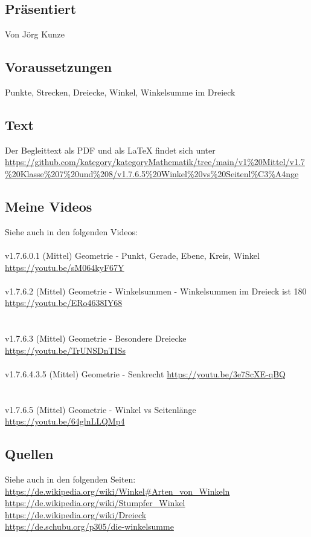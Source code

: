 \documentclass[a4paper]{amsart}
\theoremstyle{definition}
\begin{document}
\subsection*{Präsentiert}
Von Jörg Kunze

\subsection*{Voraussetzungen}
Punkte, Strecken, Dreiecke, Winkel, Winkelsumme im Dreieck

\subsection*{Text}
Der Begleittext als PDF und als LaTeX findet sich unter
{\tiny
   \url{https://github.com/kategory/kategoryMathematik/tree/main/v1%20Mittel/v1.7%20Klasse%207%20und%208/v1.7.6.5%20Winkel%20vs%20Seitenl%C3%A4nge}
}

\subsection*{Meine Videos}
Siehe auch in den folgenden Videos:\\
\\
v1.7.6.0.1 (Mittel) Geometrie - Punkt, Gerade, Ebene, Kreis, Winkel\\
\url{https://youtu.be/sM064kyF67Y}\\
\\
v1.7.6.2 (Mittel) Geometrie - Winkelsummen - Winkelsummen im Dreieck ist 180\\
\url{https://youtu.be/ERo4638IY68}\\
\\
\\v1.7.6.3 (Mittel) Geometrie - Besondere Dreiecke
\url{https://youtu.be/TrUNSDnTISs}
\\
\\v1.7.6.4.3.5 (Mittel) Geometrie - Senkrecht
\url{https://youtu.be/3e7ScXE-qBQ}\\
\\
\\v1.7.6.5 (Mittel) Geometrie - Winkel vs Seitenlänge
\url{https://youtu.be/64glnLLQMp4}

\subsection*{Quellen}
Siehe auch in den folgenden Seiten:\\
\url{https://de.wikipedia.org/wiki/Winkel#Arten_von_Winkeln}\\
\url{https://de.wikipedia.org/wiki/Stumpfer_Winkel}\\
\url{https://de.wikipedia.org/wiki/Dreieck}\\
\url{https://de.schubu.org/p305/die-winkelsumme}
\end{document}
